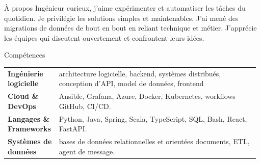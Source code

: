 \documentclass[
	a4paper, %
	10pt, %
]{resume} %
\begin{document}
\fontsize{9.5}{11}\selectfont


\begin{rSection}{À propos}
	\begingroup\small
	Ingénieur curieux, j'aime expérimenter et automatiser les tâches du quotidien. Je privilégie les solutions simples et maintenables. J'ai mené des migrations de données de bout en bout en reliant technique et métier. J'apprécie les équipes qui discutent ouvertement et confrontent leurs idées.
	\endgroup
\end{rSection}




\begin{rSection}{Compétences}
	\begin{tabular}{@{}p{0.20\linewidth} p{0.78\linewidth}@{}}
		\textbf{Ingénierie logicielle}      & architecture logicielle, backend, systèmes distribués, conception d'API, model de données, frontend \\
		\textbf{Cloud \& DevOps}            & Ansible, Grafana, Azure, Docker, Kubernetes, workflows GitHub, CI/CD. \\
		\textbf{Langages \& Frameworks}     & Python, Java, Spring, Scala, TypeScript, SQL, Bash, React, FastAPI. \\
		\textbf{Systèmes de données}        & bases de données relationnelles et orientées documents, ETL, agent de message. \\
	\end{tabular}
\end{rSection}

\end{document}
